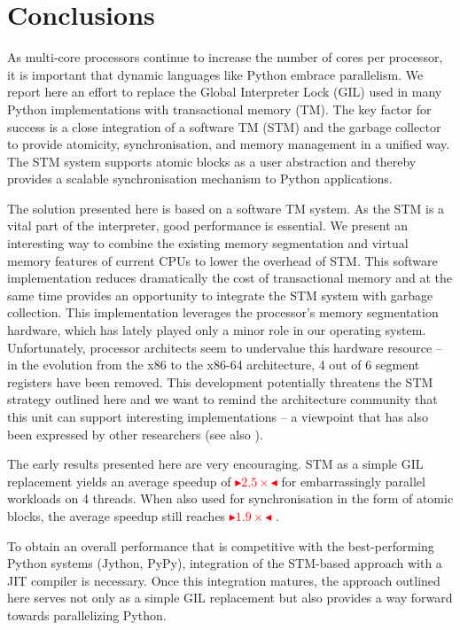\documentclass{sigplanconf}
\newcommand{\mynote}[2]{%
  \textcolor{red}{%
    \fbox{\bfseries\sffamily\scriptsize#1}%
    {\small$\blacktriangleright$\textsf{\emph{#2}}$\blacktriangleleft$}%
  }%
}
\newcommand\remi[1]{\mynote{Remi}{#1}}
\begin{document}
\section{Conclusions}

As multi-core processors continue to increase the number of cores per
processor, it is important that dynamic languages like Python embrace
parallelism.  We report here an effort to replace the Global
Interpreter Lock (GIL) used in many Python implementations with
transactional memory (TM). The key factor for success is a close
integration of a software TM (STM) and the garbage collector to
provide atomicity, synchronisation, and memory management in a unified
way.  The STM system supports atomic blocks as a user abstraction and
thereby provides a scalable synchronisation mechanism to Python
applications.


The solution presented here is based on a software TM system.  As the
STM is a vital part of the interpreter, good performance is
essential. We present an interesting way to combine the existing
memory segmentation and virtual memory features of current CPUs to
lower the overhead of STM. This software implementation reduces
dramatically the cost of transactional memory and at the same time
provides an opportunity to integrate the STM system with garbage
collection.  This implementation leverages the processor's memory
segmentation hardware, which has lately played only a minor role in
our operating system.  Unfortunately, processor architects seem to
undervalue this hardware resource -- in the evolution from the x86 to
the x86{-}64 architecture, 4 out of 6 segment registers have been
removed. This development potentially threatens the STM strategy
outlined here and we want to remind the architecture community that
this unit can support interesting implementations -- a viewpoint that
has also been expressed by other researchers (see also
\cite{bennet10}).

The early results presented here are very encouraging. STM as a simple
GIL replacement yields an average speedup of \remi{$2.5\times$} for
embarrassingly parallel workloads on 4 threads.  When also used for
synchronisation in the form of atomic blocks, the average speedup
still reaches \remi{$1.9\times$}.

To obtain an overall performance that is competitive with the
best-performing Python systems (Jython, PyPy), integration of the
STM-based approach with a JIT compiler is necessary. Once this
integration matures, the approach outlined here serves not only as a
simple GIL replacement but also provides a way forward towards
parallelizing Python.
\end{document}
